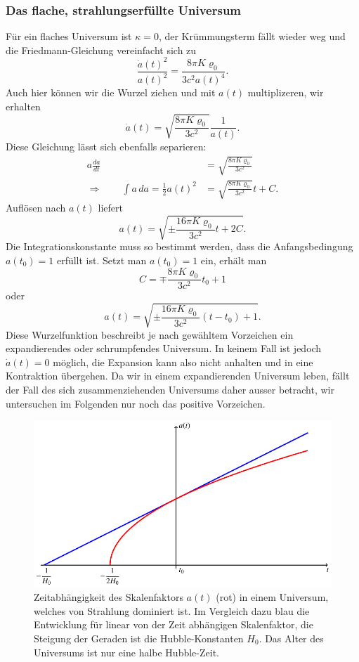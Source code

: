 \subsubsection{Das flache, strahlungserfüllte Universum}
Für ein flaches Universum ist $\kappa=0$, der Krümmungsterm fällt wieder
weg und die Friedmann-Gleichung vereinfacht sich zu
\begin{equation*}
\frac{\dot a(t)^2}{a(t)^2}
=
\frac{8\pi K\varrho_0}{3c^2 a(t)^4}.
\end{equation*}
Auch hier können wir die Wurzel ziehen und mit $a(t)$ multiplizeren,
wir erhalten
\begin{equation*}
\dot a(t)
=
\sqrt{\frac{8\pi K\varrho_0}{3c^2}}\frac1{a(t)}.
\end{equation*}
Diese Gleichung lässt sich ebenfalls separieren:
\begin{align*}
a\frac{da}{dt}
&=
\sqrt{\frac{8\pi K\varrho_0}{3c^2}}
\\
\Rightarrow\qquad
\int a\,da
=
\frac12a(t)^2
&=
\sqrt{\frac{8\pi K\varrho_0}{3c^2}}t + C.
\end{align*}
Auflösen nach $a(t)$ liefert
\[
a(t)
=
\sqrt{\pm\frac{16\pi K\varrho_0}{3c^2}t + 2C}.
\]
Die Integrationskonstante muss so bestimmt werden, dass die
Anfangsbedingung $a(t_0)=1$  erfüllt ist.
Setzt man $a(t_0)=1$ ein, erhält man
\[
C
=
\mp\frac{8\pi K\varrho_0}{3c^2}t_0+1
\]
oder
\begin{equation}
a(t)
= 
\sqrt{\pm\frac{16\pi K\varrho_0}{3c^2}(t-t_0) + 1}.
\label{skript:friedmann:a(t)}
\end{equation}
Diese Wurzelfunktion beschreibt je nach gewähltem Vorzeichen ein
expandierendes oder schrumpfendes Universum.
In keinem Fall ist jedoch $\dot a(t)=0$ möglich, die Expansion kann
also nicht anhalten und in eine Kontraktion übergehen.
Da wir in einem expandierenden Universum leben, fällt der Fall
des sich zusammenziehenden Universums daher ausser betracht,
wir untersuchen im Folgenden nur noch das positive Vorzeichen.

\begin{figure}
\centering
\includegraphics{chapters/tikz/friedmann-strahlung.pdf}
\caption{Zeitabhängigkeit des Skalenfaktors $a(t)$ ({\color{red}rot})
in einem Universum, welches von Strahlung dominiert ist.
Im Vergleich dazu {\color{blue}blau} die Entwicklung für linear von der
Zeit abhängigen Skalenfaktor, die Steigung der Geraden ist die
Hubble-Konstanten $H_0$.
Das Alter des Universums ist nur eine halbe Hubble-Zeit.
\label{skript:friedmann:graph:strahlung}}
\end{figure}

